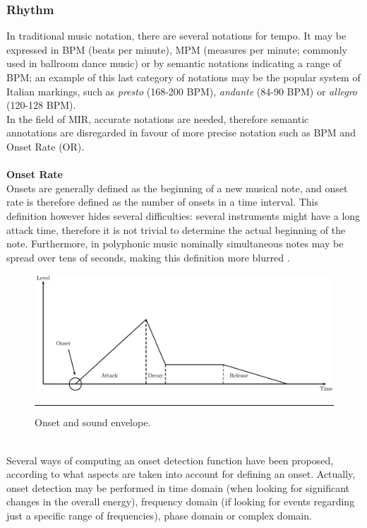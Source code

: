 \subsubsection{Rhythm}
In traditional music notation, there are several notations for tempo. It may be expressed in BPM (beats per minute), MPM (measures per minute; commonly used in ballroom dance music) or by semantic notations indicating a range of BPM; an example of this last category of notations may be the popular system of Italian markings, such as \textit{presto} (168-200 BPM), \textit{andante} (84-90 BPM) or \textit{allegro} (120-128 BPM). \\ In the field of MIR, accurate notations are needed, therefore semantic annotations are disregarded in favour of more precise notation such as BPM and Onset Rate (OR).
\\ \\ 
\textbf{Onset Rate} \\ 
Onsets are generally defined as the beginning of a new musical note, and onset rate is therefore defined as the number of onsets in a time interval. This definition however hides several difficulties: several instruments might have a long attack time, therefore it is not trivial to determine the actual beginning of the note. Furthermore, in polyphonic music nominally simultaneous notes may be spread over tens of seconds, making this definition more blurred \cite{dixon06}. 
\begin{figure}[h]
\begin{center}
\includegraphics[scale=0.75]{Figures/onsets.pdf}
    \rule{20em}{0.5pt}
  \caption[Onset and sound envelope]{Onset and sound envelope.}
  \label{fig:GStreamer}
\end{center}
\end{figure} \\
Several ways of computing an onset detection function have been proposed, according to what aspects are taken into account for defining an onset. Actually, onset detection may be performed in time domain (when looking for significant changes in the overall energy), frequency domain (if looking for events regarding just a specific range of frequencies), phase domain or complex domain. 
